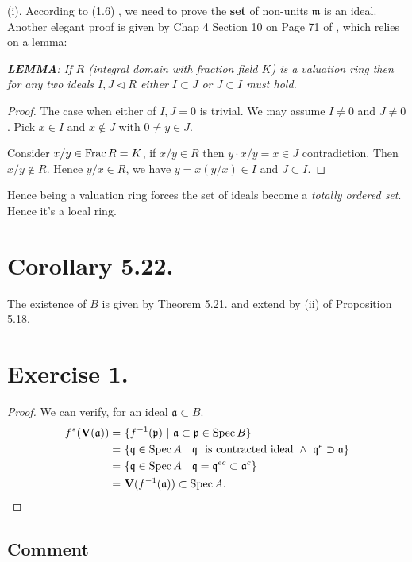 (i). According to (1.6) \cite{atiyah1994introduction}, we need to prove the \textbf{set} of non-units $\mathfrak m$  is an ideal. Another elegant proof is given by Chap 4 Section 10 on Page 71 of \cite{matsumura1989commutative}, which relies on a lemma: 

\textit{\textbf{LEMMA}: If $R$ (integral domain with fraction field $K$) is a valuation ring then for any two ideals $I,J\triangleleft R$ either $I\subset J$ or $J\subset I$ must hold.}
\begin{proof}
	The case when either of $I,J=0$ is trivial. We may assume $I\neq 0$ and $J\neq 0$. Pick $x\in I$ and $x\notin J$ with $0\neq y\in J$. 

	Consider $x/y\in \operatorname{Frac} R=K$, if $x/y\in R$ then $y\cdot x/y=x\in J$ contradiction. Then $x/y\notin R$. Hence $y/x\in R$, we have $y=x(y/x)\in I$ and $J\subset I$.
\end{proof}

Hence being a valuation ring forces the set of ideals become a \textit{totally ordered set}. Hence it's a local ring.

\section{Corollary 5.22.}

The existence of $B$ is given by Theorem 5.21. and extend by (ii) of Proposition 5.18.

\section{Exercise 1.}

\begin{proof}
	We can verify, for an ideal $\mathfrak a\subset B$.
	\begin{align*}
		f^{\ast}(\mathbf V(\mathfrak a)) =&~ \{f^{-1}(\mathfrak p) ~\vert~ \mathfrak a\subset\mathfrak p\in \operatorname{Spec} B\}\\
		=&~ \{\mathfrak q\in \operatorname{Spec} A ~\vert~ \mathfrak q ~\text{ is contracted ideal}~ \land~ \mathfrak q^e\supset \mathfrak a \}\\
		=&~ \{\mathfrak q\in \operatorname{Spec} A ~\vert~ \mathfrak q=\mathfrak q^{ec}\subset \mathfrak a^c\}\\
		=&~ \mathbf V(f^{-1}(\mathfrak a))\subset \operatorname{Spec} A.	
	\end{align*}
\end{proof}
\subsection{Comment}

